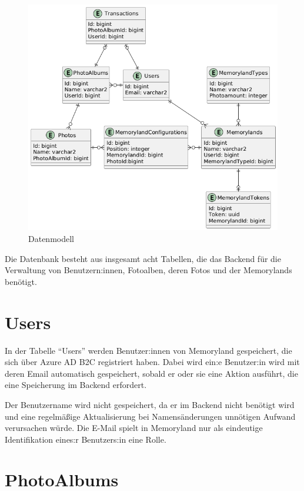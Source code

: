 
\begin{figure} [h t]
    \centering
    \includegraphics[scale=0.6]{puml/erd.png}
    \caption{Datenmodell}
    \label{fig:erd-diagram}
\end{figure}

Die Datenbank besteht aus insgesamt acht Tabellen, die das Backend 
für die Verwaltung von Benutzern:innen, Fotoalben, deren Fotos und der 
Memorylands benötigt.

\section{Users}

In der Tabelle ``Users'' werden Benutzer:innen von Memoryland gespeichert, die sich über Azure AD B2C
registriert haben. Dabei wird ein:e Benutzer:in wird mit deren Email automatisch gespeichert, sobald
er oder sie eine Aktion ausführt, die eine Speicherung im Backend erfordert. 

Der Benutzername wird nicht gespeichert, da er im Backend nicht benötigt wird und eine 
regelmäßige Aktualisierung bei Namensänderungen unnötigen Aufwand verursachen würde. Die 
E-Mail spielt in Memoryland nur als eindeutige Identifikation eines:r Benutzers:in eine Rolle.

\section{PhotoAlbums}

